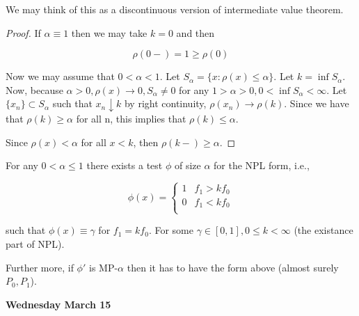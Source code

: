 \documentclass[11pt,fleqn]{book} %
\begin{document}
We may think of this as a discontinuous version of intermediate value theorem. 

\begin{proof}
	If $\alpha \equiv 1$ then we may take $k = 0$ and then 

			$$\rho(0-) = 1 \geq \rho(0) $$

	Now we may assume that $0 < \alpha < 1$. Let $S_\alpha = \{x : \rho(x) \leq \alpha \}$. Let $k = \inf S_\alpha$. Now, because $\alpha > 0, \rho(x) \rightarrow 0, S_\alpha \neq 0$ for any $ 1> \alpha > 0, 0 < \inf S_\alpha < \infty$. Let $\{x_n \} \subset S_\alpha$ such that $x_n \downarrow k$ by right continuity, $\rho(x_n) \rightarrow \rho(k)$. Since we have that $\rho(k) \geq \alpha$ for all n, this implies that $\rho(k) \leq \alpha$. 

	Since $\rho(x) < \alpha$ for all $x < k$, then $\rho(k-) \geq \alpha$. 
\end{proof}
 

 \begin{theorem}
 	For any $0 < \alpha \leq 1$ there exists a test $\phi$ of size $\alpha$ for the NPL form, i.e., 

 			$$\phi(x) = \left\{\begin{array}{ll}
 				1 & f_1 > k f_0\\
 				0 & f_1 < k f_0\\
 			\end{array} \right. $$

 	such that $\phi(x) \equiv \gamma$ for $f_1 = k f_0$. For some $\gamma \in [0, 1], 0 \leq k < \infty$ (the existance part of NPL).
 	
 	Further more, if $\phi'$ is MP-$\alpha$ then it has to have the form above (almost surely $P_0, P_1$). 		
 \end{theorem}

 \textbf{Wednesday March 15}\\
\end{document}
